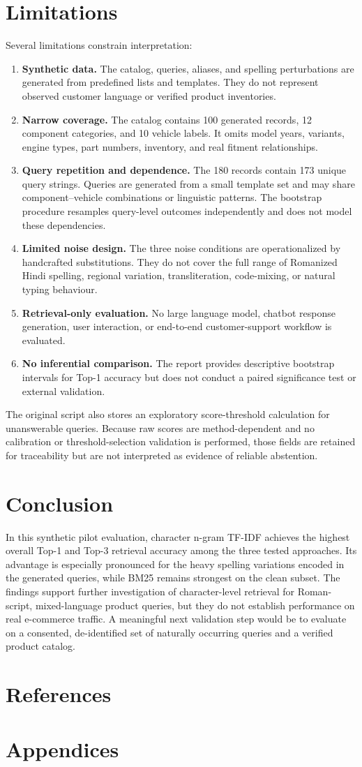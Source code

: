 \documentclass[11pt,a4paper]{article}
\begin{document}
\section{Limitations}
Several limitations constrain interpretation:
\begin{enumerate}
  \item \textbf{Synthetic data.} The catalog, queries, aliases, and spelling perturbations are generated from predefined lists and templates. They do not represent observed customer language or verified product inventories.
  \item \textbf{Narrow coverage.} The catalog contains 100 generated records, 12 component categories, and 10 vehicle labels. It omits model years, variants, engine types, part numbers, inventory, and real fitment relationships.
  \item \textbf{Query repetition and dependence.} The 180 records contain 173 unique query strings. Queries are generated from a small template set and may share component--vehicle combinations or linguistic patterns. The bootstrap procedure resamples query-level outcomes independently and does not model these dependencies.
  \item \textbf{Limited noise design.} The three noise conditions are operationalized by handcrafted substitutions. They do not cover the full range of Romanized Hindi spelling, regional variation, transliteration, code-mixing, or natural typing behaviour.
  \item \textbf{Retrieval-only evaluation.} No large language model, chatbot response generation, user interaction, or end-to-end customer-support workflow is evaluated.
  \item \textbf{No inferential comparison.} The report provides descriptive bootstrap intervals for Top-1 accuracy but does not conduct a paired significance test or external validation.
\end{enumerate}
The original script also stores an exploratory score-threshold calculation for unanswerable queries. Because raw scores are method-dependent and no calibration or threshold-selection validation is performed, those fields are retained for traceability but are not interpreted as evidence of reliable abstention.

\section{Conclusion}
In this synthetic pilot evaluation, character n-gram TF-IDF achieves the highest overall Top-1 and Top-3 retrieval accuracy among the three tested approaches. Its advantage is especially pronounced for the heavy spelling variations encoded in the generated queries, while BM25 remains strongest on the clean subset. The findings support further investigation of character-level retrieval for Roman-script, mixed-language product queries, but they do not establish performance on real e-commerce traffic. A meaningful next validation step would be to evaluate on a consented, de-identified set of naturally occurring queries and a verified product catalog.

\section*{References}
\printbibliography[heading=none]
\appendix
\section*{Appendices}

\end{document}
